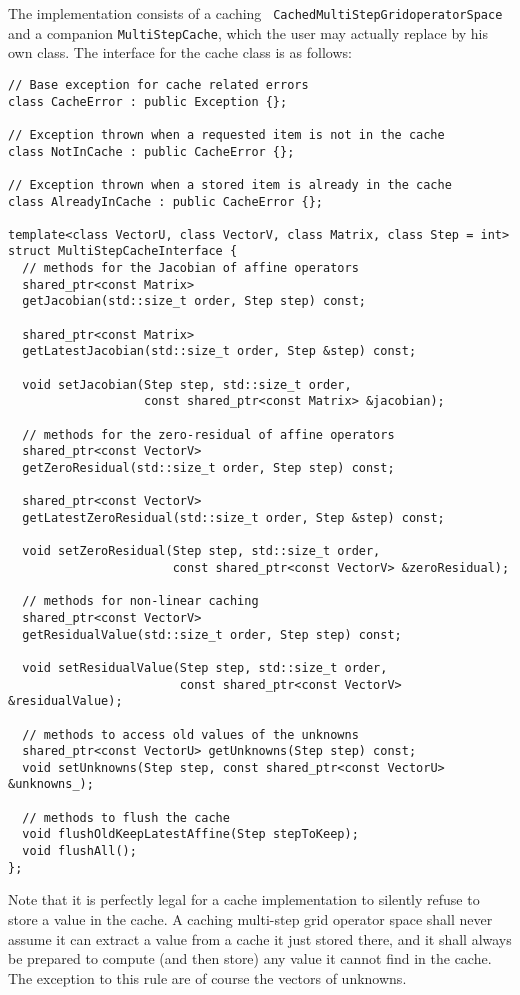 \documentclass[11pt,a4paper,DIV11,%
notitlepage,oneside,abstracton,%
bibtotoc]{scrartcl}
\begin{document}
The implementation consists of a caching {\tt
  CachedMultiStepGridoperatorSpace} and a companion {\tt MultiStepCache},
which the user may actually replace by his own class.  The interface for the
cache class is as follows:
\begin{lstlisting}
// Base exception for cache related errors
class CacheError : public Exception {};

// Exception thrown when a requested item is not in the cache
class NotInCache : public CacheError {};

// Exception thrown when a stored item is already in the cache
class AlreadyInCache : public CacheError {};

template<class VectorU, class VectorV, class Matrix, class Step = int>
struct MultiStepCacheInterface {
  // methods for the Jacobian of affine operators
  shared_ptr<const Matrix>
  getJacobian(std::size_t order, Step step) const;

  shared_ptr<const Matrix>
  getLatestJacobian(std::size_t order, Step &step) const;

  void setJacobian(Step step, std::size_t order,
                   const shared_ptr<const Matrix> &jacobian);

  // methods for the zero-residual of affine operators
  shared_ptr<const VectorV>
  getZeroResidual(std::size_t order, Step step) const;

  shared_ptr<const VectorV>
  getLatestZeroResidual(std::size_t order, Step &step) const;

  void setZeroResidual(Step step, std::size_t order,
                       const shared_ptr<const VectorV> &zeroResidual);

  // methods for non-linear caching
  shared_ptr<const VectorV>
  getResidualValue(std::size_t order, Step step) const;

  void setResidualValue(Step step, std::size_t order,
                        const shared_ptr<const VectorV> &residualValue);

  // methods to access old values of the unknowns
  shared_ptr<const VectorU> getUnknowns(Step step) const;
  void setUnknowns(Step step, const shared_ptr<const VectorU> &unknowns_);

  // methods to flush the cache
  void flushOldKeepLatestAffine(Step stepToKeep);
  void flushAll();
};
\end{lstlisting}
Note that it is perfectly legal for a cache implementation to silently refuse
to store a value in the cache.  A caching multi-step grid operator space shall
never assume it can extract a value from a cache it just stored there, and it
shall always be prepared to compute (and then store) any value it cannot find
in the cache.  The exception to this rule are of course the vectors of
unknowns.
\end{document}
